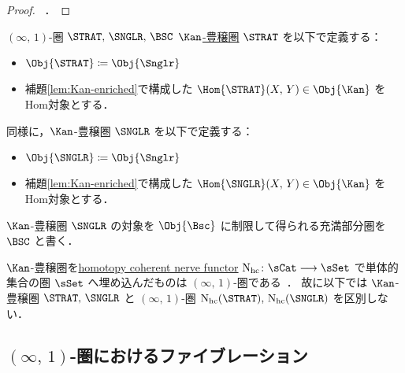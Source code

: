 \documentclass[TQFT_main]{subfiles}
\begin{document}
\begin{proof}
    ~\cite[Lemma 4.1.4.]{AFT2014stratified}．
\end{proof}

\begin{mydef}[label=def:Strat-infty]{{$(\infty,\, 1)$}-圏 {$\STRAT,\, \SNGLR,\, \BSC$}}
    \hyperref[def:enriched]{$\Kan$-豊穣圏} $\STRAT$ を以下で定義する：
    \begin{itemize}
        \item $\Obj{\STRAT} \coloneqq \Obj{\Snglr}$
        \item 補題\ref{lem:Kan-enriched}で構成した $\Hom{\STRAT}(X,\, Y) \in \Obj{\Kan}$ をHom対象とする．
    \end{itemize}
    同様に，$\Kan$-豊穣圏 $\SNGLR$ を以下で定義する：
    \begin{itemize}
        \item $\Obj{\SNGLR} \coloneqq \Obj{\Snglr}$
        \item 補題\ref{lem:Kan-enriched}で構成した $\Hom{\SNGLR}(X,\, Y) \in \Obj{\Kan}$ をHom対象とする．
    \end{itemize}
    
    \tcblower

    $\Kan$-豊穣圏 $\SNGLR$ の対象を \hyperref[def:Snglr]{$\Obj{\Bsc}$} に制限して得られる充満部分圏を $\BSC$ と書く．

    
\end{mydef}

\begin{marker}
    $\Kan$-豊穣圏を\hyperref[def:nerve-hc]{homotopy coherent nerve functor} $\mathrm{N}_{\text{hc}} \colon \sCat \lto \sSet$ で単体的集合の圏 $\sSet$ へ埋め込んだものは $(\infty,\, 1)$-圏である~\cite[Proposition 1.1.5.10.]{lurie2008higher}．
    故に以下では $\Kan$-豊穣圏 $\STRAT,\, \SNGLR$ と $(\infty,\, 1)$-圏 $\mathrm{N}_{\text{hc}} (\STRAT),\, \mathrm{N}_{\text{hc}} (\SNGLR)$ を区別しない．
\end{marker}

\subsection{$(\infty,\, 1)$-圏におけるファイブレーション}
\end{document}
